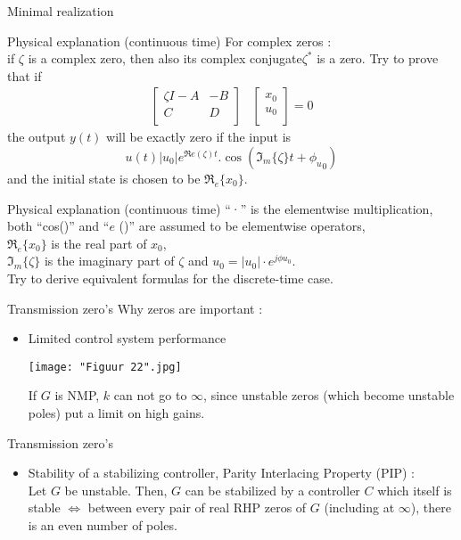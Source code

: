 \begin{subsection}{Minimal realization}
\begin{frame}{Physical explanation (continuous time)}
For complex zeros :\\
if $\zeta$ is a complex zero, then also its complex conjugate$\zeta^*$ is a zero. Try to prove that if
\begin{align*}
\begin{bmatrix}
    \zeta I-A&-B\\
    C&D\\
\end{bmatrix}&
\begin{bmatrix}
    x_0\\
    u_0\\
\end{bmatrix}=0
\end{align*}
the output $y(t)$ will be exactly zero if the input is
$$u(t)|u_0|e^{\Re e(\zeta)t}.\cos({\Im_ m\{\zeta\}t}+{\phi_u}_0)$$
and the initial state is chosen to be $\Re_e\{x_0\}.$
\end{frame}


\begin{frame}{Physical explanation (continuous time)}
“·” is the
elementwise multiplication, both “cos()” and “$e$
()” are assumed
to be elementwise operators,\\
\vspace{0.5cm}
$\Re_e\{x_0\}$ is the real part
of $x_0$,\\ $\Im_ m\{\zeta\} $ is the imaginary part of $\zeta$ and $u_0 = |u_0|·e^{j\phi u_0}.$\\
\vspace{0.5cm}
Try to derive equivalent formulas for the discrete-time case.
\end{frame}

\begin{frame}{Transmission zero's}
Why zeros are important :
\begin{itemize}
    \item Limited control system performance
        \begin{center}
        \texttt{[image: "Figuur 22".jpg]}
        \end{center}
    If $G$ is NMP, $k$ can not go to $\infty$, since unstable zeros
    (which become unstable poles) put a limit on high gains.

\end{itemize}
\end{frame}

\begin{frame}{Transmission zero's}
\begin{itemize}
    \item Stability of a stabilizing controller, Parity Interlacing
    Property (PIP) :\\
    Let $G$ be unstable. Then, $G$ can be stabilized by a
    controller $C$ which itself is stable $\Leftrightarrow$ between every pair
of real RHP zeros of $G$ (including at $\infty$), there is an
even number of poles.\\
\end{itemize}
\end{frame}


\end{subsection}
